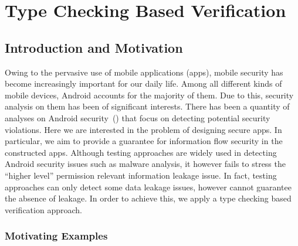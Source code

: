 
\chapter{Type Checking Based Verification} \label{ch:sta}

\section{Introduction and Motivation}\label{sec:sta_intro}

Owing to the pervasive use of mobile applications (apps), mobile security has become increasingly important for our daily life.
Among all different kinds of mobile devices, Android accounts for the majority of them. Due to this, security analysis on them has been of significant interests. There has been a quantity of analyses on Android security~(\cite{Enck:2009:UAS:1512148.1512324, Fuchs2010, Arzt:2014:FPC:2666356.2594299, Wei:2014:APG:2660267.2660357, Li:2015:IDI:2818754.2818791,icse18:androidApp}) that focus on detecting potential security violations. Here we are interested in the problem of designing secure apps.
In particular, we aim to provide a guarantee for information flow security in the constructed apps. Although testing approaches are widely used in detecting Android security issues such as malware analysis, it however fails to stress the ``higher level'' permission relevant information leakage issue. In fact, testing approaches can only detect some data leakage issues, however cannot guarantee the absence of leakage. In order to achieve this, we apply a type checking based verification approach.

\subsection{Motivating Examples}


